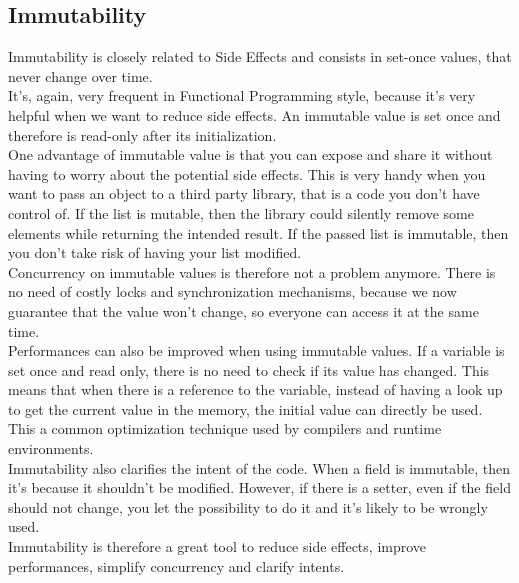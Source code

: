 \subsection{Immutability}\label{subsec:immutability}
Immutability is closely related to Side Effects and consists in set-once
values, that never change over time. \\
It's, again, very frequent in Functional Programming style, because
it's very helpful when we want to reduce side effects.
An immutable value is set once and therefore is read-only after its
initialization. \\
\newline
One advantage of immutable value is that you can expose and share
it without having to worry about the potential side effects.
This is very handy when you want to pass an object to a third party
library, that is a code you don't have control of.
If the list is mutable, then the library could silently remove some
elements while returning the intended result.
If the passed list is immutable, then you don't take risk of having your
list modified. \\
\newline
Concurrency on immutable values is therefore not a problem anymore.
There is no need of costly locks and synchronization mechanisms, because
we now guarantee that the value won't change, so everyone can access it
at the same time. \\
\newline
Performances can also be improved when using immutable values.
If a variable is set once and read only, there is no need to check if
its value has changed.
This means that when there is a reference to the variable, instead of
having a look up to get the current value in the memory, the initial
value can directly be used.
This a common optimization technique used by compilers and runtime
environments. \\
\newline
Immutability also clarifies the intent of the code.
When a field is immutable, then it's because it shouldn't be modified.
However, if there is a setter, even if the field should not change,
you let the possibility to do it and it's likely to be wrongly used. \\
\newline
Immutability is therefore a great tool to reduce side effects, improve
performances, simplify concurrency and clarify intents.

